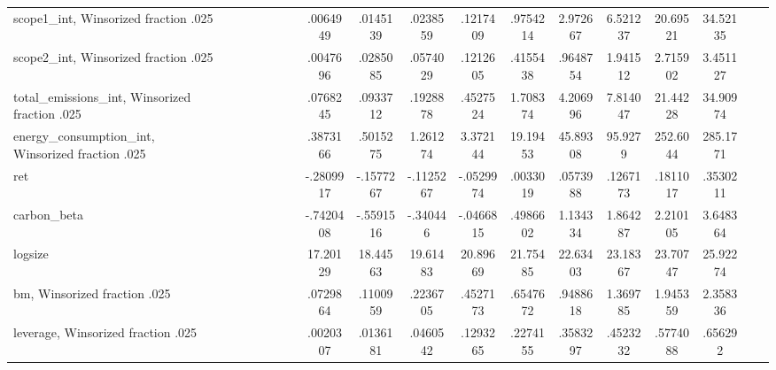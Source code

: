 {\begin{tabular}{l*{1}{ccccccccccccccccc}}
scope1\_int, Winsorized fraction .025&            &            &            &            &            &            &    .0064949&    .0145139&    .0238559&    .1217409&    .9754214&    2.972667&    6.521237&    20.69521&    34.52135&            &            \\
scope2\_int, Winsorized fraction .025&            &            &            &            &            &            &    .0047696&    .0285085&    .0574029&    .1212605&    .4155438&    .9648754&    1.941512&    2.715902&    3.451127&            &            \\
total\_emissions\_int, Winsorized fraction .025&            &            &            &            &            &            &    .0768245&    .0933712&    .1928878&    .4527524&    1.708374&    4.206996&    7.814047&    21.44228&    34.90974&            &            \\
energy\_consumption\_int, Winsorized fraction .025&            &            &            &            &            &            &    .3873166&    .5015275&    1.261274&    3.372144&    19.19453&    45.89308&     95.9279&    252.6044&    285.1771&            &            \\
ret                 &            &            &            &            &            &            &   -.2809917&   -.1577267&   -.1125267&   -.0529974&    .0033019&    .0573988&    .1267173&    .1811017&    .3530211&            &            \\
carbon\_beta         &            &            &            &            &            &            &   -.7420408&   -.5591516&    -.340446&   -.0466815&    .4986602&    1.134334&    1.864287&    2.210105&    3.648364&            &            \\
logsize             &            &            &            &            &            &            &    17.20129&    18.44563&    19.61483&    20.89669&    21.75485&    22.63403&    23.18367&    23.70747&    25.92274&            &            \\
bm, Winsorized fraction .025&            &            &            &            &            &            &    .0729864&    .1100959&    .2236705&    .4527173&    .6547672&    .9488618&    1.369785&    1.945359&    2.358336&            &            \\
leverage, Winsorized fraction .025&            &            &            &            &            &            &    .0020307&    .0136181&    .0460542&    .1293265&    .2274155&    .3583297&    .4523232&    .5774088&     .656292&            &            \\

\end{tabular}}
